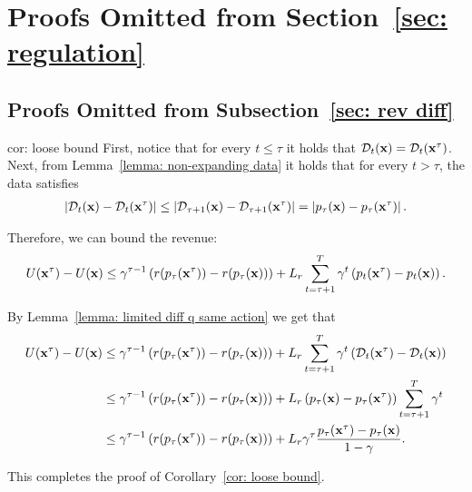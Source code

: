 \section{Proofs Omitted from Section~\ref{sec: regulation}}\label{appendix:regulation}

\subsection{Proofs Omitted from Subsection~\ref{sec: rev diff}}

\begin{comment}
\begin{corollary}\label{cor: loose bound}
It holds that
\begin{align*}
&U(\bft{x}^\tau) - U(\bft{x}) \leq \\
&\gamma^{\tau - 1} \left( r(p_\tau(\bft{x}^\tau)) - r(p_\tau(\bft{x})) \right) + L_r \gamma^{\tau} \frac{p_\tau(\bft{x}^\tau) - p_\tau(\bft{x})}{1 - \gamma}.
\end{align*}
\end{corollary}
\end{comment}


\begin{proofof}{cor: loose bound}
First, notice that for every $t \leq \tau$ it holds that $\mathcal{D}_t({\bf{x}}) = \mathcal{D}_t({\bf{x}}^\tau)$. Next, from Lemma~\ref{lemma: non-expanding data} it holds that for every $t > \tau$, the data satisfies
\begin{align*}
\left| \mathcal{D}_t({\bf{x}}) - \mathcal{D}_t({\bf{x}}^\tau) \right| \leq \left| \mathcal{D}_{\tau + 1}({\bf{x}}) - \mathcal{D}_{\tau + 1}({\bf{x}}^\tau) \right| = \left| p_\tau({\bf{x}}) - p_{\tau}({\bf{x}}^\tau) \right|.
\end{align*}

Therefore, we can bound the revenue:
\begin{align*}
U({\bf{x}}^\tau) - U({\bf{x}}) \leq \gamma^{\tau - 1} \left( r(p_\tau({\bf{x}}^\tau)) - r(p_\tau({\bf{x}})) \right) + L_r \sum_{t = \tau + 1}^T \gamma^t \left( p_t({\bf{x}}^\tau) - p_t({\bf{x}})\right).
\end{align*}

By Lemma~\ref{lemma: limited diff q same action} we get that
\begin{align*}
U({\bf{x}}^\tau) - U({\bf{x}}) &\leq \gamma^{\tau - 1} \left( r(p_\tau({\bf{x}}^\tau)) - r(p_\tau({\bf{x}})) \right) + L_r \sum_{t = \tau + 1}^T \gamma^t \left( \mathcal{D}_t({\bf{x}}^\tau) - \mathcal{D}_t({\bf{x}})\right) \\
&\leq \gamma^{\tau - 1} \left( r(p_\tau({\bf{x}}^\tau)) - r(p_\tau({\bf{x}})) \right) + L_r \left( p_\tau({\bf{x}}) - p_\tau({\bf{x}}^\tau)\right) \sum_{t = \tau + 1}^T \gamma^t \\
&\leq \gamma^{\tau - 1} \left( r(p_\tau({\bf{x}}^\tau)) - r(p_\tau({\bf{x}})) \right) + L_r \gamma^{\tau} \frac{p_\tau({\bf{x}}^\tau) - p_\tau({\bf{x}})}{1 - \gamma}.
\end{align*}

This completes the proof of Corollary~\ref{cor: loose bound}.
\end{proofof}

